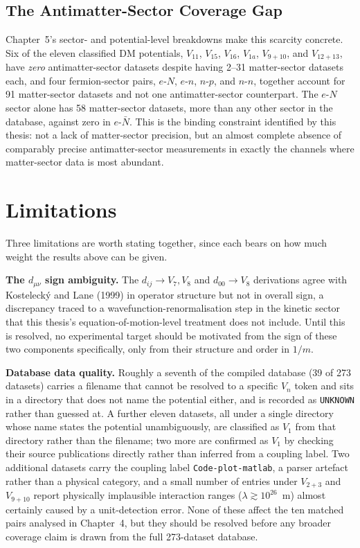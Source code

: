\documentclass[main]{subfiles}
\begin{document}
\subsection{The Antimatter-Sector Coverage Gap}

Chapter~5's sector- and potential-level breakdowns make this scarcity
concrete. Six of the eleven classified DM potentials,
$V_{11}$, $V_{15}$, $V_{16}$, $V_{1a}$, $V_{9+10}$, and $V_{12+13}$, have
\emph{zero} antimatter-sector datasets despite having 2--31 matter-sector
datasets each, and four fermion-sector pairs, $e$-$N$, $e$-$n$,
$n$-$p$, and $n$-$n$, together account for 91 matter-sector datasets and
not one antimatter-sector counterpart. The $e$-$N$ sector alone has 58
matter-sector datasets, more than any other sector in the database, against
zero in $e$-$\bar N$. This is the binding constraint identified by this
thesis: not a lack of matter-sector precision, but an almost complete
absence of comparably precise antimatter-sector measurements in exactly the
channels where matter-sector data is most abundant.

\section{Limitations}
\label{sec:limitations}

Three limitations are worth stating together, since each bears on how much
weight the results above can be given.

\textbf{The $d_{\mu\nu}$ sign ambiguity.} The $d_{ij}\to V_7,V_8$ and
$d_{00}\to V_8$ derivations agree with Kostelecký and Lane (1999) in
operator structure but not in overall sign, a discrepancy traced to a
wavefunction-renormalisation step in the kinetic sector that this thesis's
equation-of-motion-level treatment does not include. Until this is
resolved, no experimental target should be motivated from the sign of
these two components specifically, only from their structure and order in
$1/m$.

\textbf{Database data quality.} Roughly a seventh of the compiled database
(39 of 273 datasets) carries a filename that cannot be resolved to a
specific $V_n$ token and sits in a directory that does not name the
potential either, and is recorded as \texttt{UNKNOWN} rather than guessed
at. A further eleven datasets, all under a single directory whose name
states the potential unambiguously, are classified as $V_1$ from that
directory rather than the filename; two more are confirmed as $V_1$ by
checking their source publications directly rather than inferred from a
coupling label. Two additional datasets carry the coupling label
\texttt{Code-plot-matlab}, a parser artefact rather than a physical
category, and a small number of entries under $V_{2+3}$ and $V_{9+10}$
report physically implausible interaction ranges ($\lambda\gtrsim10^{26}$~m)
almost certainly caused by a unit-detection error. None of these affect
the ten matched pairs analysed in Chapter~4, but they should be resolved
before any broader coverage claim is drawn from the full 273-dataset
database.
\end{document}
